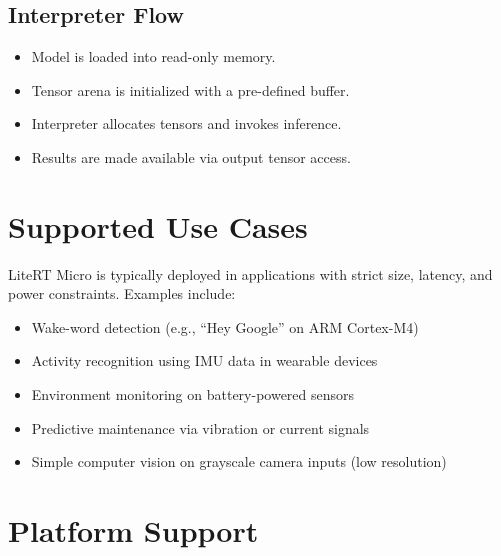 \subsection*{Interpreter Flow}



\begin{itemize}

	\item Model is loaded into read-only memory.

	\item Tensor arena is initialized with a pre-defined buffer.

	\item Interpreter allocates tensors and invokes inference.

	\item Results are made available via output tensor access.

\end{itemize}



\section{Supported Use Cases}



LiteRT Micro is typically deployed in applications with strict size, latency, and power constraints. Examples include:



\begin{itemize}

	\item Wake-word detection (e.g., ``Hey Google'' on ARM Cortex-M4)

	\item Activity recognition using IMU data in wearable devices

	\item Environment monitoring on battery-powered sensors

	\item Predictive maintenance via vibration or current signals

	\item Simple computer vision on grayscale camera inputs (low resolution)

\end{itemize}



\section{Platform Support}



